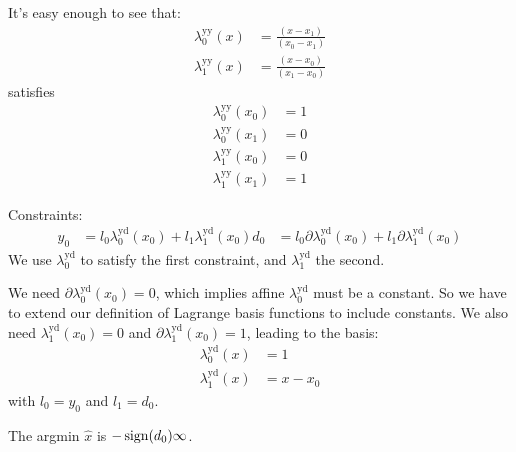 


It's easy enough to see that:
\begin{align}
\lambda^{\text{yy}}_0(x) & = \frac {(x - x_1)} {(x_0 - x_1)} \\
\lambda^{\text{yy}}_1(x) & = \frac {(x - x_0)} {(x_1 - x_0)} \nonumber
\end{align}
satisfies
\begin{align}
\lambda^{\text{yy}}_0(x_0) & = 1 \\
\lambda^{\text{yy}}_0(x_1) & = 0 \nonumber \\
\lambda^{\text{yy}}_1(x_0) & = 0 \nonumber \\
\lambda^{\text{yy}}_1(x_1) & = 1 \nonumber 
\end{align}


Constraints:
\begin{equation}
\begin{aligned}
y_0 & = l_0 \lambda^{\text{yd}}_0 (x_0) + l_1 \lambda^{\text{yd}}_1 (x_0) 
d_0 & = l_0 \partial\lambda^{\text{yd}}_0 (x_0) + l_1 \partial\lambda^{\text{yd}}_1 (x_0) 
\end{aligned}
\end{equation}
We use $\lambda^{\text{yd}}_0$ to satisfy the first constraint,
and $\lambda^{\text{yd}}_1$ the second.

We need $\partial\lambda^{\text{yd}}_0 (x_0) = 0$,
which implies affine $\lambda^{\text{yd}}_0$ 
must be a constant.
So we have to extend our definition of Lagrange basis functions
to include constants.
We also need $\lambda^{\text{yd}}_1 (x_0) = 0$ and
$\partial\lambda^{\text{yd}}_1 (x_0) = 1$, leading to the basis:
\begin{align}
\lambda^{\text{yd}}_0 (x) & = 1 \\
\lambda^{\text{yd}}_1 (x) & = x - x_0 \nonumber
\end{align}
with $l_0 = y_0$ and $l_1 = d_0$.

The argmin $\hat{x}$ is $-\operatorname*{sign}(d_0)\infty$.


